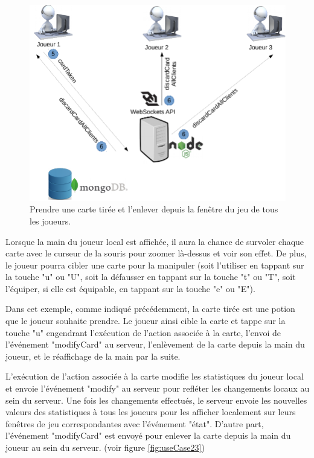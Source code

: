 \documentclass[12pt]{report}
\begin{document}
			\begin{figure}[h!]
		  	\centering
		    \includegraphics[scale=0.5]{images/useCase22.png}
		    \caption{Prendre une carte tirée et l'enlever depuis la fenêtre du jeu de tous les joueurs.}
				\label{fig:useCase22}
		  \end{figure}

			Lorsque la main du joueur local est affichée, il aura la chance de survoler chaque carte avec le curseur de la souris pour zoomer là-dessus et voir son effet. De plus, le joueur pourra cibler une carte pour la manipuler (soit l'utiliser en tappant sur la touche "u" ou "U", soit la défausser en tappant sur la touche "t" ou "T", soit l'équiper, si elle est équipable, en tappant sur la touche "e" ou "E").

			Dans cet exemple, comme indiqué précédemment, la carte tirée est une potion que le joueur souhaite prendre. Le joueur ainsi cible la carte et tappe sur la touche "u" engendrant l'exécution de l'action associée à la carte, l'envoi de l'événement "modifyCard" au serveur, l'enlèvement de la carte depuis la main du joueur, et le réaffichage de la main par la suite.

			L'exécution de l'action associée à la carte modifie les statistiques du joueur local et envoie l'événement "modify" au serveur pour refléter les changements locaux au sein du serveur. Une fois les changements effectués, le serveur envoie les nouvelles valeurs des statistiques à tous les joueurs pour les afficher localement sur leurs fenêtres de jeu correspondantes avec l'événement "état". D'autre part, l'événement "modifyCard" est envoyé pour enlever la carte depuis la main du joueur au sein du serveur. (voir figure \ref{fig:useCase23})
\end{document}
